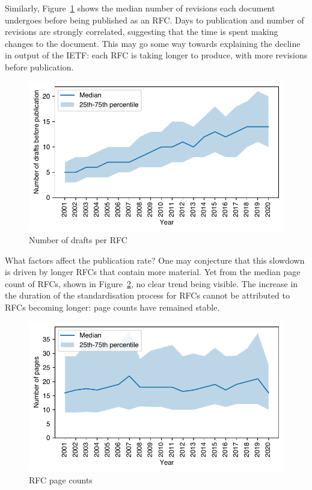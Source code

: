 \documentclass[twocolumn,10pt]{article}
\newlength{\figureWidthOneColumn}
\begin{document}
Similarly, Figure~\ref{fig:drafts_year} shows the median number of
revisions each document undergoes before being published as an RFC. Days to
publication and number of revisions are strongly correlated, suggesting
that the time is spent making changes to the document. This may go some way
towards explaining the decline in output of the IETF: each RFC is taking
longer to produce, with more revisions before publication. 

\begin{figure}
  \centering
  \includegraphics[width=\figureWidthOneColumn]{figures-prev/imc-2021/documents/draft_counts_yearly.pdf}
  \caption{
    Number of drafts per RFC
  }
  \label{fig:drafts_year}
\end{figure}


What factors affect the publication rate?  One may conjecture that this
slowdown is driven by longer RFCs that contain more material. Yet from the
median page count of RFCs, shown in Figure~\ref{fig:pages_year}, no clear
trend being visible. The increase in the duration of the standardisation
process for RFCs cannot be attributed to RFCs becoming longer: page counts
have remained stable. 

\begin{figure}
  \centering
  \includegraphics[width=\figureWidthOneColumn]{figures-prev/imc-2021/documents/page_counts_yearly_dt.pdf}
  \caption{
    RFC page counts
  }
  \label{fig:pages_year}
\end{figure}
\end{document}
